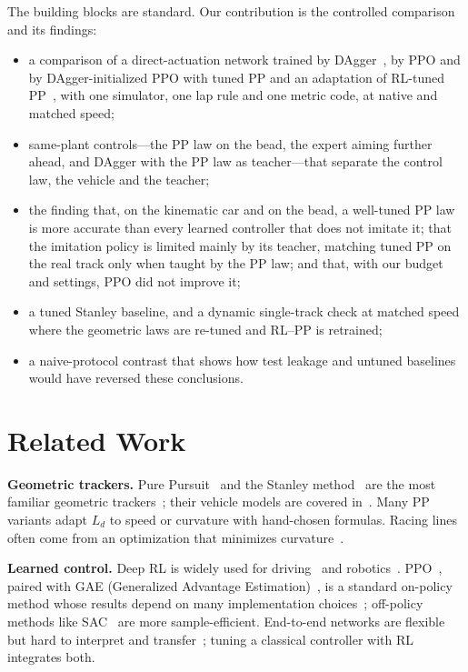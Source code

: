 \documentclass{IJCAS}
\begin{document}
The building blocks are standard. Our contribution is the controlled comparison and its findings:
\begin{itemize}
\item a comparison of a direct-actuation network trained by DAgger~\cite{ross2011}, by PPO and by DAgger-initialized PPO with tuned PP and an adaptation of RL-tuned PP~\cite{elgouhary2026}, with one simulator, one lap rule and one metric code, at native and matched speed;
\item same-plant controls---the PP law on the bead, the expert aiming further ahead, and DAgger with the PP law as teacher---that separate the control law, the vehicle and the teacher;
\item the finding that, on the kinematic car and on the bead, a well-tuned PP law is more accurate than every learned controller that does not imitate it; that the imitation policy is limited mainly by its teacher, matching tuned PP on the real track only when taught by the PP law; and that, with our budget and settings, PPO did not improve it;
\item a tuned Stanley baseline, and a dynamic single-track check at matched speed where the geometric laws are re-tuned and RL--PP is retrained;
\item a naive-protocol contrast that shows how test leakage and untuned baselines would have reversed these conclusions.
\end{itemize}

\section{Related Work}
\textbf{Geometric trackers.} Pure Pursuit~\cite{coulter1992} and the Stanley method~\cite{hoffmann2007} are the most familiar geometric trackers~\cite{snider2009}; their vehicle models are covered in~\cite{rajamani2012,kong2015}. Many PP variants adapt $L_d$ to speed or curvature with hand-chosen formulas. Racing lines often come from an optimization that minimizes curvature~\cite{heilmeier2020,betz2022}.

\textbf{Learned control.} Deep RL is widely used for driving~\cite{kiran2022} and robotics~\cite{kober2013}. PPO~\cite{schulman2017}, paired with GAE (Generalized Advantage Estimation)~\cite{schulman2016}, is a standard on-policy method whose results depend on many implementation choices~\cite{andrychowicz2021}; off-policy methods like SAC~\cite{haarnoja2018} are more sample-efficient. End-to-end networks are flexible but hard to interpret and transfer~\cite{evans2023}; tuning a classical controller with RL~\cite{elgouhary2026} integrates both.
\end{document}
